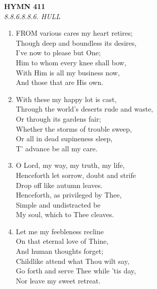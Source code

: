 \documentclass[11pt,a4paper]{article}
\begin{document}
\newpage
\begin{center}
    {\Large \textbf{HYMN 411}}
    \\
    \textit{8.8.6.8.8.6. HULL}
\end{center}
\vspace{1em}

\begin{enumerate}
    \item FROM various cares my heart retires; \\
        Though deep and boundless its desires, \\
        I've now to please but One; \\
        Him to whom every knee shall bow, \\
        With Him is all my business now, \\
        And those that are His own.

    \item With these my happy lot is cast, \\
        Through the world's deserts rude and waste, \\
        Or through its gardens fair; \\
        Whether the storms of trouble sweep, \\
        Or all in dead supineness sleep, \\
        T' advance be all my care.

    \item O Lord, my way, my truth, my life, \\
        Henceforth let sorrow, doubt and strife \\
        Drop off like autumn leaves. \\
        Henceforth, as privileged by Thee, \\
        Simple and undistracted be \\
        My soul, which to Thee cleaves.

    \item Let me my feebleness recline \\
        On that eternal love of Thine, \\
        And human thoughts forget; \\
        Childlike attend what Thou wilt say, \\
        Go forth and serve Thee while 'tis day, \\
        Nor leave my sweet retreat.

\end{enumerate}
\end{document}

